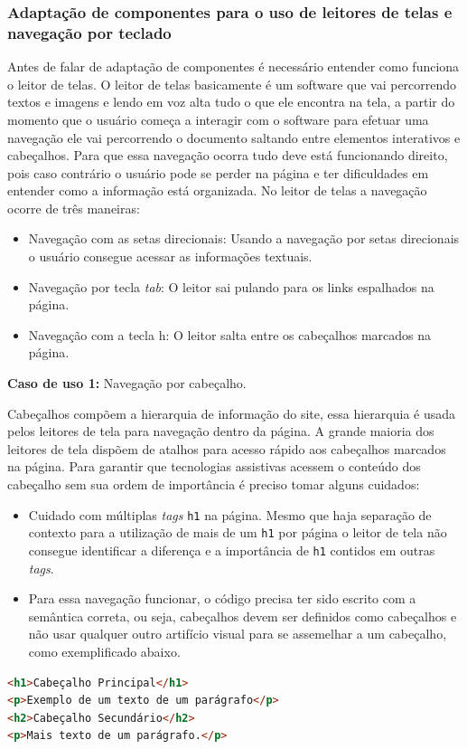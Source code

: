 \subsubsection{Adaptação de componentes para o uso de leitores de telas e navegação por teclado}
{Antes de falar de adaptação de componentes é necessário entender como funciona o leitor de telas. O leitor de telas basicamente é um software que vai percorrendo textos e imagens e lendo em voz alta tudo o que ele encontra na tela, a partir do momento que o usuário começa a interagir com o software para efetuar uma navegação ele vai percorrendo o documento saltando entre elementos interativos e cabeçalhos. Para que essa navegação ocorra tudo deve está funcionando direito, pois caso contrário o usuário pode se perder na página e ter dificuldades em entender como a informação está organizada. No leitor de telas a navegação ocorre de três maneiras: 
\begin{itemize}
    \item Navegação com as setas direcionais: Usando a navegação por setas direcionais o usuário consegue acessar as informações textuais.
    \item Navegação por tecla \textit{tab}: O leitor sai pulando para os links espalhados na página.
    \item Navegação com a tecla h: O leitor salta entre os cabeçalhos marcados na página.
\end{itemize}

{

{\textbf{Caso de uso 1:} Navegação por cabeçalho.}

Cabeçalhos compõem a hierarquia de informação do site, essa hierarquia é usada pelos leitores de tela para navegação dentro da página. A grande maioria dos leitores de tela dispõem de atalhos para acesso rápido aos cabeçalhos marcados na página. Para garantir que tecnologias assistivas acessem o conteúdo dos cabeçalho sem sua ordem de importância é preciso tomar alguns cuidados: 
\begin{itemize}
    \item Cuidado com múltiplas \textit{tags} \lstinline{h1} na página. Mesmo que haja separação de contexto para a utilização de mais de um \lstinline{h1} por página o leitor de tela não consegue identificar a diferença e a importância de \lstinline{h1} contidos em outras \textit{tags}.
    \item Para essa navegação funcionar, o código precisa ter sido escrito com a semântica correta, ou seja, cabeçalhos devem ser definidos como cabeçalhos e não usar qualquer outro artifício visual para se assemelhar a um cabeçalho, como exemplificado abaixo. 
\end{itemize}
{\begin{lstlisting}[language=html,caption={cabeçalhos com hierarquia}, label=code9:good]
<h1>Cabeçalho Principal</h1>
<p>Exemplo de um texto de um parágrafo</p>
<h2>Cabeçalho Secundário</h2>
<p>Mais texto de um parágrafo.</p>
\end{lstlisting}}


}}
